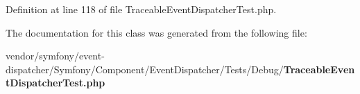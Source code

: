 Definition at line 118 of file Traceable\+Event\+Dispatcher\+Test.\+php.



The documentation for this class was generated from the following file\+:\begin{DoxyCompactItemize}
\item 
vendor/symfony/event-\/dispatcher/\+Symfony/\+Component/\+Event\+Dispatcher/\+Tests/\+Debug/{\bf Traceable\+Event\+Dispatcher\+Test.\+php}\end{DoxyCompactItemize}
